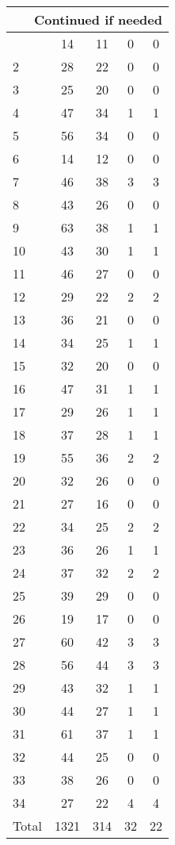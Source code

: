 \begin{center}
\begin{longtable}{l|c|c|c|c}
\hline \multicolumn{5}{|r|}{{Continued if needed}} \\ \hline
\endfoot 
1 & 14 & 11 & 0 & 0\\ \hline
2 & 28 & 22 & 0 & 0\\ \hline
3 & 25 & 20 & 0 & 0\\ \hline
4 & 47 & 34 & 1 & 1\\ \hline
5 & 56 & 34 & 0 & 0\\ \hline
6 & 14 & 12 & 0 & 0\\ \hline
7 & 46 & 38 & 3 & 3\\ \hline
8 & 43 & 26 & 0 & 0\\ \hline
9 & 63 & 38 & 1 & 1\\ \hline
10 & 43 & 30 & 1 & 1\\ \hline
11 & 46 & 27 & 0 & 0\\ \hline
12 & 29 & 22 & 2 & 2\\ \hline
13 & 36 & 21 & 0 & 0\\ \hline
14 & 34 & 25 & 1 & 1\\ \hline
15 & 32 & 20 & 0 & 0\\ \hline
16 & 47 & 31 & 1 & 1\\ \hline
17 & 29 & 26 & 1 & 1\\ \hline
18 & 37 & 28 & 1 & 1\\ \hline
19 & 55 & 36 & 2 & 2\\ \hline
20 & 32 & 26 & 0 & 0\\ \hline
21 & 27 & 16 & 0 & 0\\ \hline
22 & 34 & 25 & 2 & 2\\ \hline
23 & 36 & 26 & 1 & 1\\ \hline
24 & 37 & 32 & 2 & 2\\ \hline
25 & 39 & 29 & 0 & 0\\ \hline
26 & 19 & 17 & 0 & 0\\ \hline
27 & 60 & 42 & 3 & 3\\ \hline
28 & 56 & 44 & 3 & 3\\ \hline
29 & 43 & 32 & 1 & 1\\ \hline
30 & 44 & 27 & 1 & 1\\ \hline
31 & 61 & 37 & 1 & 1\\ \hline
32 & 44 & 25 & 0 & 0\\ \hline
33 & 38 & 26 & 0 & 0\\ \hline
34 & 27 & 22 & 4 & 4\\ \hline
Total & 1321 & 314 & 32 & 22
\end{longtable}
\end{center}



